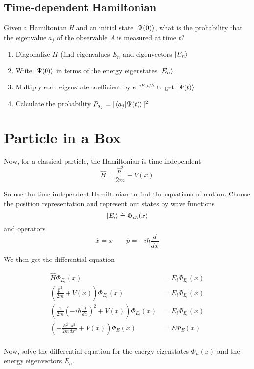 \documentclass{article}
\begin{document}
\subsection{Time-dependent Hamiltonian}
Given a Hamiltonian \textit{H} and an initial state $\ket{\Psi(0)}$, what is the probability that the eigenvalue $a_j$ of the observable $A$ is measured at time $t$?

\begin{enumerate}
  \item Diagonalize $H$ (find eigenvalues $E_n$ and eigenvectors $\ket{E_n}$
  \item Write $\ket{\Psi(0)}$ in terms of the energy eigenstates $\ket{E_n}$
  \item Multiply each eigenstate coefficient by $e^{-i E_n t / \hbar}$ to get $\ket{\Psi(t)}$
  \item Calculate the probability $P_{a_j} = |\braket{a_j | \Psi(t)}|^2$
\end{enumerate}

\section{Particle in a Box}

Now, for a classical particle, the Hamiltonian is time-independent
$$
  \hat{H} = \frac{\hat{p}^2}{2m} + V(x)
$$

So use the time-independent Hamiltonian to find the equations of motion.  Choose the position representation and represent our states by wave functions
$$
  \ket{E_i} \doteq \Phi_{E_i}(x)
$$
and operators
$$
  \hat{x} \doteq x \qquad
  \hat{p} \doteq -i\hbar \frac{d}{dx}
$$

We then get the differential equation

\begin{align*}
  \hat{H} \Phi_{E_i}(x)                                                             & =  E_i \Phi_{E_i}(x) \\
  \left(\frac{\hat{p}^2}{2m} + V(x)\right)\Phi_{E_i}(x)                             & =  E_i \Phi_{E_i}(x) \\
  \left(\frac{1}{2m} \left( -i\hbar\frac{d}{dx}\right)^2 + V(x)\right)\Phi_{E_i}(x) & =  E_i \Phi_{E_i}(x) \\
  \left(-\frac{\hbar^2}{2m} \frac{d^2}{dx^2} + V(x)\right)\Phi_{E}(x)               & =  E \Phi_{E}(x)     \\
\end{align*}

Now, solve the differential equation for the energy eigenstates $\Phi_n(x)$ and the energy eigenvectors $E_n$.
\end{document}
